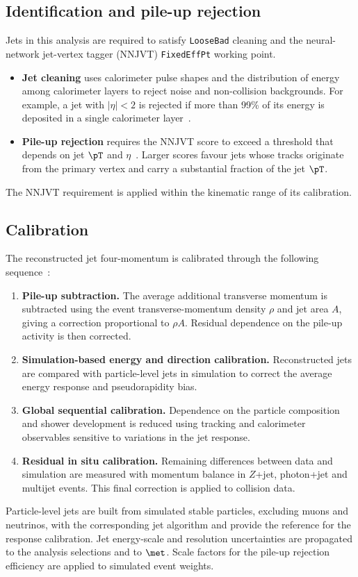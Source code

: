 \subsection{Identification and pile-up rejection}

Jets in this analysis are required to satisfy \texttt{LooseBad} cleaning and the neural-network jet-vertex tagger (NNJVT) \texttt{FixedEffPt} working point.
\begin{itemize}
    \item \textbf{Jet cleaning} uses calorimeter pulse shapes and the distribution of energy among calorimeter layers to reject noise and non-collision backgrounds. For example, a jet with $|\eta|<2$ is rejected if more than 99\% of its energy is deposited in a single calorimeter layer~\cite{ATLAS2015JetCleaning}.
    \item \textbf{Pile-up rejection} requires the NNJVT score to exceed a threshold that depends on jet $\pT$ and $\eta$~\cite{ATLASNNJVTSelection}. Larger scores favour jets whose tracks originate from the primary vertex and carry a substantial fraction of the jet $\pT$.
\end{itemize}
The NNJVT requirement is applied within the kinematic range of its calibration.

\subsection{Calibration}

The reconstructed jet four-momentum is calibrated through the following sequence~\cite{ATLAS2021JetCalibration}:
\begin{enumerate}
    \item \textbf{Pile-up subtraction.} The average additional transverse momentum is subtracted using the event transverse-momentum density $\rho$ and jet area $A$, giving a correction proportional to $\rho A$. Residual dependence on the pile-up activity is then corrected.
    \item \textbf{Simulation-based energy and direction calibration.} Reconstructed jets are compared with particle-level jets in simulation to correct the average energy response and pseudorapidity bias.
    \item \textbf{Global sequential calibration.} Dependence on the particle composition and shower development is reduced using tracking and calorimeter observables sensitive to variations in the jet response.
    \item \textbf{Residual in situ calibration.} Remaining differences between data and simulation are measured with momentum balance in $Z$+jet, photon+jet and multijet events. This final correction is applied to collision data.
\end{enumerate}
Particle-level jets are built from simulated stable particles, excluding muons and neutrinos, with the corresponding jet algorithm and provide the reference for the response calibration.
Jet energy-scale and resolution uncertainties are propagated to the analysis selections and to $\met$.
Scale factors for the pile-up rejection efficiency are applied to simulated event weights.
